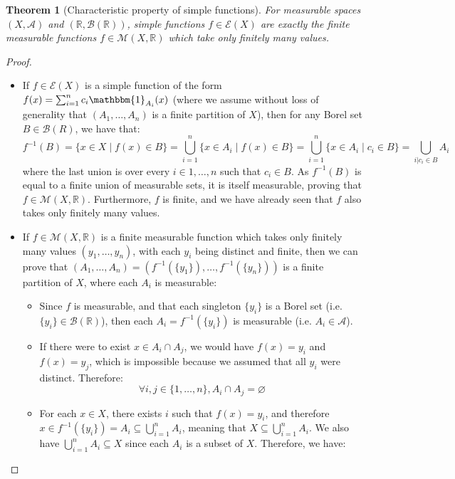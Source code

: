 \documentclass{article}
\newtheorem{theorem}{Theorem}[section]
\theoremstyle{definition}
\theoremstyle{remark}
\theoremstyle{example}
\theoremstyle{notation}
\theoremstyle{axiom}
\begin{document}
\begin{theorem}[Characteristic property of simple functions] \label{thm:simple-function-charac}
		For measurable spaces $(X, \mathcal{A})$ and $(\mathbb{R}, \mathcal{B}(\mathbb{R}))$, simple functions $f \in \mathcal{E}(X)$ are exactly the finite measurable functions $f \in \mathcal{M}(X, \mathbb{R})$ which take only finitely many values.
\end{theorem}

\begin{proof}~
		\begin{itemize}
				\item If $f \in \mathcal{E}(X)$ is a simple function of the form $f(x) = \sum_{i=1}^n c_i \mathbbm{1}_{A_i}(x)$ (where we assume without loss of generality that $(A_1, \dots, A_n)$ is a finite partition of $X$), then for any Borel set $B \in \mathcal{B}(R)$, we have that:
						$$f^{-1}(B) = \{x \in X \mid f(x) \in B\} = \bigcup_{i=1}^n \{x \in A_i \mid f(x) \in B\} = \bigcup_{i=1}^n \{x \in A_i \mid c_i \in B\} = \bigcup_{i|c_i \in B} A_i$$
				where the last union is over every $i \in 1, \dots, n$ such that $c_i \in B$. As $f^{-1}(B)$ is equal to a finite union of measurable sets, it is itself measurable, proving that $f \in \mathcal{M}(X, \mathbb{R})$. Furthermore, $f$ is finite, and we have already seen that $f$ also takes only finitely many values.
		\item If $f \in \mathcal{M}(X, \mathbb{R})$ is a finite measurable function which takes only finitely many values $(y_1, \dots, y_n)$, with each $y_i$ being distinct and finite, then we can prove that $(A_1, \dots, A_n) = (f^{-1}(\{y_1\}), \dots, f^{-1}(\{y_n\}))$ is a finite partition of $X$, where each $A_i$ is measurable:
				\begin{itemize}
						\item Since $f$ is measurable, and that each singleton $\{y_i\}$ is a Borel set (i.e. $\{y_i\} \in \mathcal{B}(\mathbb{R})$), then each $A_i = f^{-1}(\{y_i\})$ is measurable (i.e. $A_i \in \mathcal{A}$).
						\item If there were to exist $x \in A_i \cap A_j$, we would have $f(x) = y_i$ and $f(x) = y_j$, which is impossible because we assumed that all $y_i$ were distinct. Therefore:
								$$\forall i, j \in \{1, \dots, n\}, A_i \cap A_j = \varnothing$$
						\item For each $x \in X$, there exists $i$ such that $f(x) = y_i$, and therefore $x \in f^{-1}(\{y_i\}) = A_i \subseteq \bigcup_{i=1}^n A_i$, meaning that $X \subseteq \bigcup_{i=1}^n A_i$. We also have $\bigcup_{i=1}^n A_i \subseteq X$ since each $A_i$ is a subset of $X$. Therefore, we have:

\end{itemize}
\end{itemize}
\end{proof}
\end{document}
